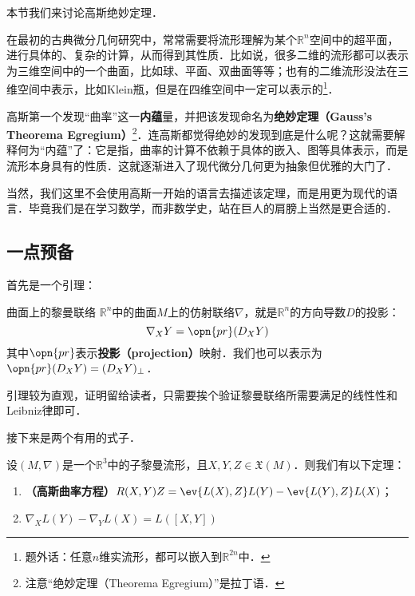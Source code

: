 

本节我们来讨论高斯绝妙定理．

在最初的古典微分几何研究中，常常需要将流形理解为某个$\mathbb{R}^n$空间中的超平面，进行具体的、复杂的计算，从而得到其性质．比如说，很多二维的流形都可以表示为三维空间中的一个曲面，比如球、平面、双曲面等等；也有的二维流形没法在三维空间中表示，比如Klein瓶，但是在四维空间中一定可以表示的\footnote{题外话：任意$n$维实流形，都可以嵌入到$\mathbb{R}^{2n}$中．}．

高斯第一个发现“曲率”这一\textbf{内蕴}量，并把该发现命名为\textbf{绝妙定理（Gauss's Theorema Egregium）}\footnote{注意“绝妙定理（Theorema Egregium）”是拉丁语．}．连高斯都觉得绝妙的发现到底是什么呢？这就需要解释何为“内蕴”了：它是指，曲率的计算不依赖于具体的嵌入、图等具体表示，而是流形本身具有的性质．这就逐渐进入了现代微分几何更为抽象但优雅的大门了．

当然，我们这里不会使用高斯一开始的语言去描述该定理，而是用更为现代的语言．毕竟我们是在学习数学，而非数学史，站在巨人的肩膀上当然是更合适的．

\subsection{一点预备}

首先是一个引理：

\begin{lemma}{曲面上的黎曼联络}\label{Egreg_lem1}
$\mathbb{R}^n$中的曲面$M$上的仿射联络$\nabla$，就是$\mathbb{R}^n$的方向导数$D$的投影：
\begin{equation}
\nabla_XY=\opn{pr}(D_XY)
\end{equation}
其中$\opn{pr}$表示\textbf{投影（projection）}映射．我们也可以表示为$\opn{pr}(D_XY)=(D_XY)_\perp$．
\end{lemma}

引理较为直观，证明留给读者，只需要挨个验证黎曼联络所需要满足的线性性和Leibniz律即可．

接下来是两个有用的式子．

\begin{theorem}{}
设$(M, \nabla)$是一个$\mathbb{R}^3$中的子黎曼流形，且$X, Y, Z\in\mathfrak{X}(M)$．则我们有以下定理：
\begin{enumerate}
\item \textbf{（高斯曲率方程）}$R(X, Y)Z=\ev{L(X), Z}L(Y)-\ev{L(Y), Z}L(X)$；
\item $\nabla_XL(Y)-\nabla_YL(X)=L([X, Y])$
\end{enumerate}
\end{theorem}

